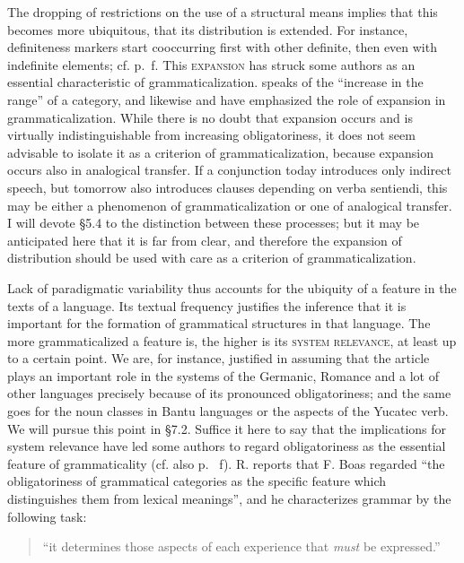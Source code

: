 The dropping of restrictions on the use of a structural means implies that this becomes more ubiquitous, that its distribution is extended. For instance, definiteness markers start cooccurring first with other definite, then even with indefinite elements; cf. p.~\pageref{page42}f. %
This \textsc{expansion} has struck some authors as an essential characteristic of grammaticalization. \citet[41]{Kuryłowicz1965} speaks of the “increase in the range” of a category, and likewise \citet[184--188]{Lord1976} and \citet[39--41]{HeineEtAl1984} have emphasized the role of expansion in grammaticalization. While there is no doubt that expansion occurs and is virtually indistinguishable from increasing obligatoriness, it does not seem advisable to isolate it as a criterion of grammaticalization, because expansion occurs also in analogical transfer. If a conjunction today introduces only indirect speech, but tomorrow also introduces clauses depending on verba sentiendi, this may be either a phenomenon of grammaticalization or one of analogical transfer. I will devote §5.4 to the distinction between these processes; but it may be anticipated here that it is far from clear, and therefore the expansion of distribution should be used with care as a criterion of grammaticalization.

Lack of paradigmatic variability thus accounts for the ubiquity of a feature in the texts of a language. Its textual frequency justifies the inference that it is important for the formation of grammatical structures in that language. The more grammaticalized a feature is, the higher is its \textsc{system relevance}, at least up to a certain point. We are, for instance, justified in assuming that the article plays an important role in the systems of the Germanic, Romance and a lot of other languages precisely because of its pronounced obligatoriness; and the same goes for the noun classes in Bantu languages or the aspects of the Yucatec verb. We will pursue this point in §7.2. Suffice it here to say that the implications for system relevance have led some authors to regard obligatoriness as the essential feature of grammaticality (cf. also p.~\pageref{page14b}%
f). R. \citet[489]{Jakobson1959} reports that F. Boas regarded “the obligatoriness of grammatical categories as the specific feature which distinguishes them from lexical meanings”, and he characterizes grammar by the following task:\enlargethispage{\baselineskip}

\begin{quote}
“it determines those aspects of each experience that \textit{must} be expressed.”
\end{quote}

